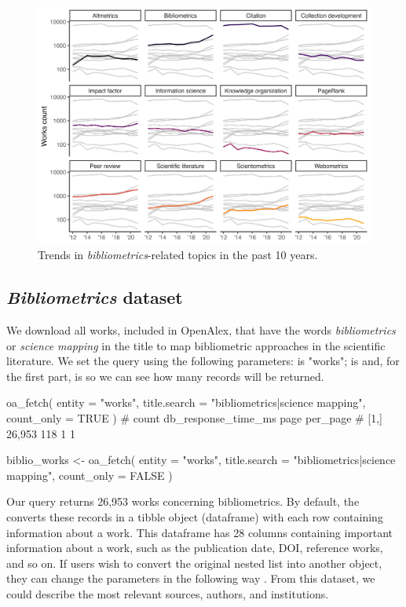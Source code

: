 \begin{figure}[htbp]
  \centering
  \includegraphics[scale=0.75]{figures/biblio-concepts}
  \caption{Trends in \emph{bibliometrics}-related topics in the past 10 years.}
  \label{bibli_concepts}
\end{figure}

\subsection{\emph{Bibliometrics} dataset}
We download all works, included in OpenAlex, that have the words \emph{bibliometrics} or \emph{science mapping} in the title to map bibliometric approaches in the scientific literature.
We set the query using the following parameters:  is "works";  is  and, for the first part,  is  so we can see how many records will be returned.

\begin{example}
oa_fetch(
  entity = "works",
  title.search = "bibliometrics|science mapping",
  count_only = TRUE
)
#      count db_response_time_ms page per_page
# [1,] 26,953                118    1        1

biblio_works <- oa_fetch(
  entity = "works",
  title.search = "bibliometrics|science mapping",
  count_only = FALSE
)
\end{example}

Our query returns 26,953 works concerning bibliometrics.
By default, the  converts these records in a tibble object (dataframe) with each row containing information about a work.
This dataframe has 28 columns containing important information about a work, such as the publication date, DOI, reference works, and so on.
If users wish to convert the original nested list into another object, they can change the parameters in the following way .
From this dataset, we could describe the most relevant sources, authors, and institutions.




